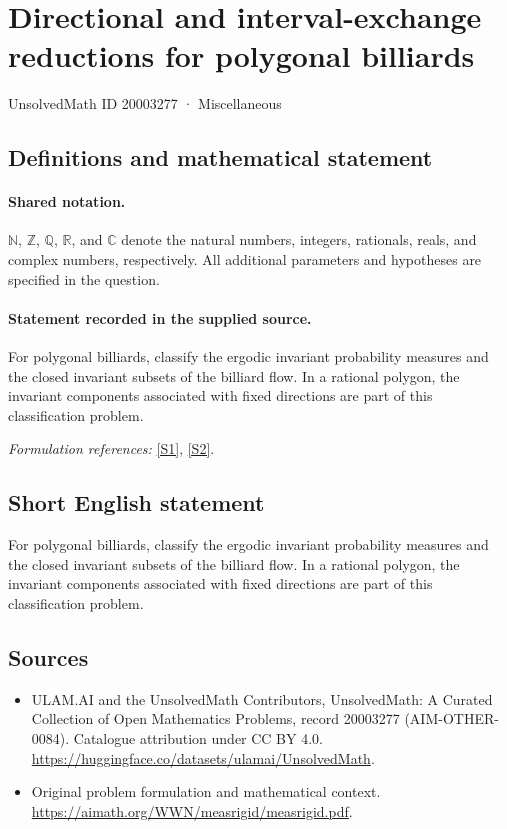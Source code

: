 \documentclass[11pt]{article}
\newcommand{\sref}[2]{\hyperlink{source:#1:#2}{[S#2]}}
\begin{document}
\setcounter{section}{20003276}
\section{Directional and interval-exchange reductions for polygonal billiards}\label{20003277}
{\small UnsolvedMath ID 20003277 · Miscellaneous}
\subsection{Definitions and mathematical statement}

\paragraph{Shared notation.}$\mathbb N$, $\mathbb Z$, $\mathbb Q$, $\mathbb R$, and $\mathbb C$ denote the natural numbers, integers, rationals, reals, and complex numbers, respectively. All additional parameters and hypotheses are specified in the question.


\paragraph{Statement recorded in the supplied source.}
For polygonal billiards, classify the ergodic invariant probability measures and the closed invariant subsets of the billiard flow. In a rational polygon, the invariant components associated with fixed directions are part of this classification problem.
\par\smallskip\textit{Formulation references:} \sref{20003277}{1}, \sref{20003277}{2}.
\subsection{Short English statement}
For polygonal billiards, classify the ergodic invariant probability measures and the closed invariant subsets of the billiard flow. In a rational polygon, the invariant components associated with fixed directions are part of this classification problem.
\subsection{Sources}
\begin{itemize}
\item[\hypertarget{source:20003277:1}{S1}] ULAM.AI and the UnsolvedMath Contributors, UnsolvedMath: A Curated Collection of Open Mathematics Problems, record 20003277 (AIM-OTHER-0084). Catalogue attribution under CC BY 4.0.
\url{https://huggingface.co/datasets/ulamai/UnsolvedMath}.
\item[\hypertarget{source:20003277:2}{S2}] Original problem formulation and mathematical context.
\url{https://aimath.org/WWN/measrigid/measrigid.pdf}.
\end{itemize}
\label{end:20003277}
\end{document}

